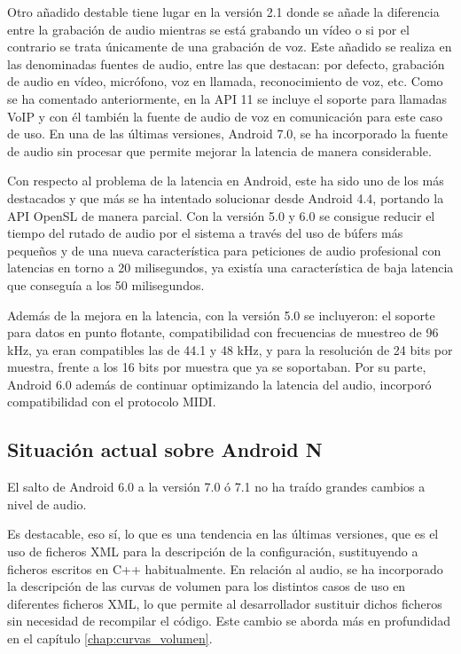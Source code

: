 Otro añadido destable tiene lugar en la versión 2.1 donde se añade la diferencia entre la grabación de audio mientras se está grabando un vídeo o si por el contrario se trata únicamente de una grabación de voz. Este añadido se realiza en las denominadas fuentes de audio, entre las que destacan: por defecto, grabación de audio en vídeo, micrófono, voz en llamada, reconocimiento de voz, etc. Como se ha comentado anteriormente, en la \gls{API} 11 se incluye el soporte para llamadas \gls{VoIP} y con él también la fuente de audio de voz en comunicación para este caso de uso. En una de las últimas versiones, Android 7.0, se ha incorporado la fuente de audio sin procesar que permite mejorar la latencia de manera considerable.

Con respecto al problema de la latencia en Android, este ha sido uno de los más destacados y que más se ha intentado solucionar desde Android 4.4, portando la \gls{API} OpenSL de manera parcial. Con la versión 5.0 y 6.0 se consigue reducir el tiempo del rutado de audio por el sistema a través del uso de búfers más pequeños y de una nueva característica para peticiones de audio profesional con latencias en torno a 20 milisegundos, ya existía una característica de baja latencia que conseguía a los 50 milisegundos.

Además de la mejora en la latencia, con la versión 5.0 se incluyeron: el soporte para datos en punto flotante, compatibilidad con frecuencias de muestreo de 96 kHz, ya eran compatibles las de 44.1 y 48 kHz, y para la resolución de 24 bits por muestra, frente a los 16 bits por muestra que ya se soportaban.
Por su parte, Android 6.0 además de continuar optimizando la latencia del audio, incorporó compatibilidad con el protocolo \gls{MIDI}.


\subsection{Situación actual sobre Android N}
El salto de Android 6.0 a la versión 7.0 ó 7.1 no ha traído grandes cambios a nivel de audio.

Es destacable, eso sí, lo que es una tendencia en las últimas versiones, que es el uso de ficheros XML para la descripción de la configuración, sustituyendo a ficheros escritos en C++ habitualmente. En relación al audio, se ha incorporado la descripción de las curvas de volumen para los distintos casos de uso en diferentes ficheros XML, lo que permite al desarrollador sustituir dichos ficheros sin necesidad de recompilar el código. Este cambio se aborda más en profundidad en el capítulo \ref{chap:curvas_volumen}.

